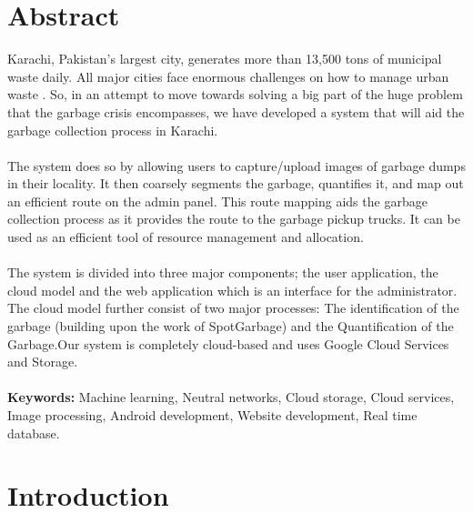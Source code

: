 \documentclass[12pt,twosided]{report}
\begin{document}
\chapter*{Abstract}
Karachi, Pakistan’s largest city, generates more than 13,500 tons of municipal waste daily. All major cities face enormous challenges on how to manage urban waste \cite{WasteManage}. So, in an attempt to move towards solving a big part of the huge problem that the garbage crisis encompasses, we have developed a system that will aid the garbage collection process in Karachi. \\
\\
The system does so by allowing users to capture/upload images of garbage dumps in their locality. It then coarsely segments the garbage, quantifies it, and map out an efficient route on the admin panel. This route mapping aids the garbage collection process as it provides the route to the garbage pickup trucks. It can be used as an efficient tool of resource management and allocation.\\
\\
The system is divided into three major components; the user application, the cloud model and the web application which is an interface for the administrator. The cloud model further consist of two major processes: The identification of the garbage (building upon the work of SpotGarbage) and the Quantification of the Garbage.Our system is completely cloud-based and uses Google Cloud Services and Storage.\\
\\
\textbf{Keywords:} Machine learning,
Neutral networks,
Cloud storage,
Cloud services, 
Image processing, 
Android development, 
Website development, 
Real time database.

\tableofcontents
\listoffigures



\chapter{Introduction}
\label{chap:intro}

\end{document}
